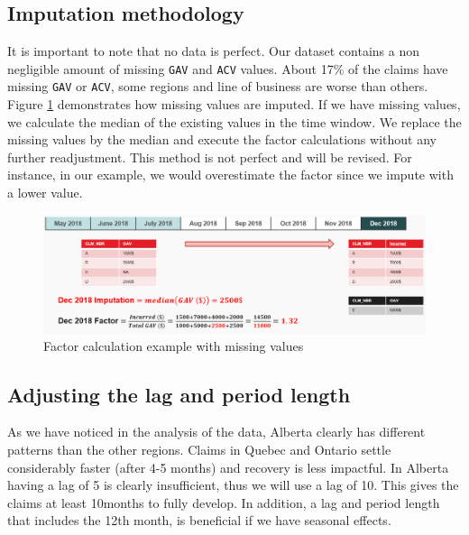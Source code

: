 \subsection{Imputation methodology}
	It is important to note that no data is perfect. Our dataset contains a non negligible amount of missing \texttt{GAV} and \texttt{ACV} values. About 17\% of the claims have missing \texttt{GAV} or \texttt{ACV}, some regions and line of business are worse than others. Figure \ref{Fig_imputation_example} demonstrates how missing values are imputed. If we have missing values, we calculate the median of the existing values in the time window. We replace the missing values by the median and execute the factor calculations without any further readjustment. This method is not perfect and will be revised. For instance, in our example, we would overestimate the factor since we impute with a lower value.  
	\begin{figure}[H]
		\begin{center}
			\includegraphics[scale=0.4]{Graphiques/imputation_example} 
			\renewcommand{\figurename}{Figure}
			\caption{Factor calculation example with missing values}\label{Fig_imputation_example}
		\end{center}
	\end{figure}

\subsection{Adjusting the lag and period length}
As we have noticed in the analysis of the data, Alberta clearly has different patterns than the other regions. Claims in Quebec and Ontario settle considerably faster (after 4-5 months) and recovery is less impactful. In Alberta having a lag of 5 is clearly insufficient, thus we will use a lag of 10. This gives the claims at least 10months to fully develop. In addition, a lag and period length that includes the 12th month, is beneficial if we have seasonal effects.
